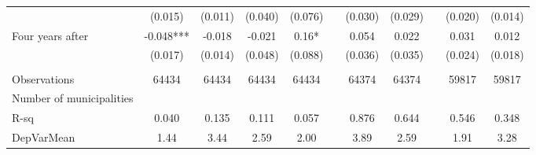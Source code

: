 \begin{tabular}{lcccccccccc}
      & (0.015) & (0.011) & (0.040) & (0.076) &       & (0.030) & (0.029) &       & (0.020) & (0.014) \\
Four years after & -0.048*** & -0.018 & -0.021 & 0.16* &       & 0.054 & 0.022 &       & 0.031 & 0.012 \\
      & (0.017) & (0.014) & (0.048) & (0.088) &       & (0.036) & (0.035) &       & (0.024) & (0.018) \\
      &       &       &       &       &       &       &       &       &       &  \\
\midrule
Observations & 64434 & 64434 & 64434 & 64434 &       & 64374 & 64374 &       & 59817 & 59817 \\
Number of municipalities &       &       &       &       &       &       &       &       &       &  \\
R-sq  & 0.040 & 0.135 & 0.111 & 0.057 &       & 0.876 & 0.644 &       & 0.546 & 0.348 \\
DepVarMean & 1.44  & 3.44  & 2.59  & 2.00  &       & 3.89  & 2.59  &       & 1.91  & 3.28 \\
\bottomrule
\bottomrule
\end{tabular}%
